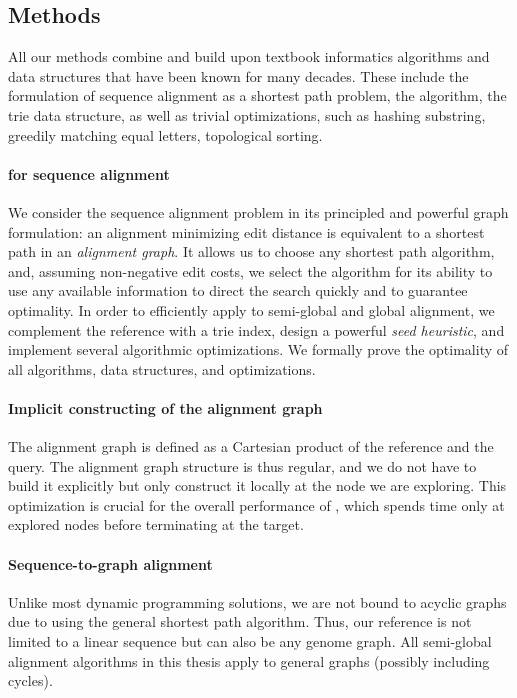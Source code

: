 \subsection*{Methods}

All our methods combine and build upon textbook informatics algorithms and data
structures that have been known for many decades. These include the formulation
of sequence alignment as a shortest path problem, the \A algorithm, the trie
data structure, as well as trivial optimizations, such as hashing substring,
greedily matching equal letters, topological sorting.

\paragraph{\A for sequence alignment}
We consider the sequence alignment problem in its principled and powerful graph
formulation: an alignment minimizing edit distance is equivalent to a shortest
path in an \emph{alignment graph}. It allows us to choose any shortest path
algorithm, and, assuming non-negative edit costs, we select the \A algorithm for
its ability to use any available information to direct the search quickly and to
guarantee optimality. In order to efficiently apply \A to semi-global and global
alignment, we complement the reference with a trie index, design a powerful
\emph{seed heuristic}, and implement several algorithmic optimizations. We
formally prove the optimality of all algorithms, data structures, and
optimizations.

\paragraph{Implicit constructing of the alignment graph}
The alignment graph is defined as a Cartesian product of the reference and the
query. The alignment graph structure is thus regular, and we do not have to
build it explicitly but only construct it locally at the node we are
exploring. This optimization is crucial for the overall performance of \A, which
spends time only at explored nodes before terminating at the target.

\paragraph{Sequence-to-graph alignment}
Unlike most dynamic programming solutions, we are not bound to acyclic graphs
due to using the general \A shortest path algorithm. Thus, our reference is not
limited to a linear sequence but can also be any genome graph. All semi-global
alignment algorithms in this thesis apply to general graphs (possibly including
cycles).

